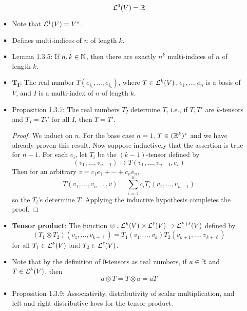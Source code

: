 \documentclass[../notes.tex]{subfiles}
\begin{document}
\begin{itemize}
    \begin{equation*}
        \lin[0]{V} = \R
    \end{equation*}
    \item Note that $\lin[1]{V}=V^*$.
    \item Defines multi-indices of $n$ of length $k$.
    \item Lemma 1.3.5: If $n,k\in\N$, then there are exactly $n^k$ multi-indices of $n$ of length $k$.
    \item $\bm{T_I}$: The real number $T(e_{i_1},\dots,e_{i_k})$, where $T\in\lin[k]{V}$, $e_1,\dots,e_n$ is a basis of $V$, and $I$ is a multi-index of $n$ of length $k$.
    \item Proposition 1.3.7: The real numbers $T_I$ determine $T$, i.e., if $T,T'$ are $k$-tensors and $T_I=T_I'$ for all $I$, then $T=T'$.
    \begin{proof}
        We induct on $n$. For the base case $n=1$, $T\in(\R^k)^*$ and we have already proven this result. Now suppose inductively that the assertion is true for $n-1$. For each $e_i$, let $T_i$ be the $(k-1)$-tensor defined by
        \begin{equation*}
            (v_1,\dots,v_{n-1}) \mapsto T(v_1,\dots,v_{n-1},e_i)
        \end{equation*}
        Then for an arbitrary $v=c_1e_1+\cdots+c_ne_n$,
        \begin{equation*}
            T(v_1,\dots,v_{n-1},v) = \sum_{i=1}^nc_iT_i(v_1,\dots,v_{n-1})
        \end{equation*}
        so the $T_i$'s determine $T$. Applying the inductive hypothesis completes the proof.
    \end{proof}
    \item \textbf{Tensor product}: The function $\otimes:\lin[k]{V}\times\lin[\ell]{V}\to\lin[k+\ell]{V}$ defined by
    \begin{equation*}
        (T_1\otimes T_2)(v_1,\dots,v_{k+\ell}) = T_1(v_1,\dots,v_k)T_2(v_{k+1},\dots,v_{k+\ell})
    \end{equation*}
    for all $T_1\in\lin[k]{V}$ and $T_2\in\lin[\ell]{V}$.
    \item Note that by the definition of 0-tensors as real numbers, if $a\in\R$ and $T\in\lin[k]{V}$, then
    \begin{equation*}
        a\otimes T = T\otimes a = aT
    \end{equation*}
    \item Proposition 1.3.9: Associativity, distributivity of scalar multiplication, and left and right distributive laws for the tensor product.

\end{itemize}
\end{document}
